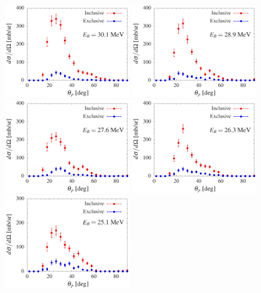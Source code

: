 \documentclass[aps,prc,onecolumn,amsmath,amssymb, preprint, 12pt]{revtex4-1}
\begin{document}
\begin{figure}[!ht]
\centering
\includegraphics[width=0.49\textwidth]{ad_70.eps}
\includegraphics[width=0.49\textwidth]{ad_80.eps}\\
\includegraphics[width=0.49\textwidth]{ad_90.eps}
\includegraphics[width=0.49\textwidth]{ad_100.eps}\\
\includegraphics[width=0.49\textwidth]{ad_110.eps}

\end{figure}
\end{document}
